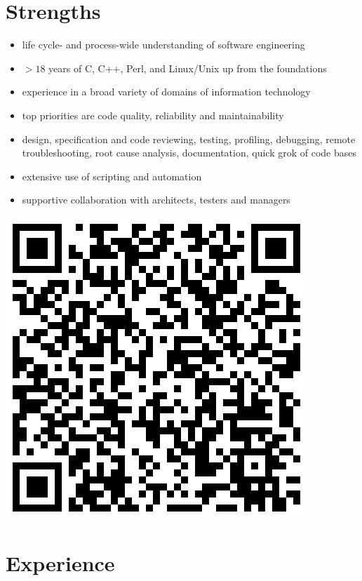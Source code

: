 \documentclass[a4paper,12pt]{article}
\newcommand{\compress}{\setlength\itemsep{-\parskip}}
\newenvironment{compressedItemize}{\begin{itemize}\compress}{\end{itemize}}
\begin{document}
\section{Strengths}

\begin{minipage}[b]{0.79\textwidth}
\begin{compressedItemize}
\item	life cycle- and process-wide understanding of software engineering
\item	$>18$ years of C, C++, Perl, and Linux/Unix up from the foundations
\item	experience in a broad variety of domains of information technology
\item	top priorities are code quality, reliability and maintainability
\item	design, specification and code reviewing, testing, profiling,
	debugging, remote \\ troubleshooting, root cause analysis,
	documentation, quick grok of code bases
\item	extensive use of scripting and automation
\item	supportive collaboration with architects, testers and managers
\end{compressedItemize}
\end{minipage}
\parbox[t]{0.20\textwidth}{\includegraphics[scale=0.25,clip=false]{qrcode}}

\section{Experience}
\end{document}
